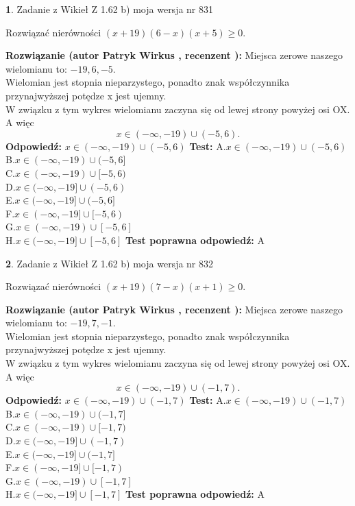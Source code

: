 \documentclass[12pt, a4paper]{article}
\theoremstyle{definition} %
\newtheorem{zad}{}
\newcommand{\zadStart}[1]{\begin{zad}#1\newline}
\newcommand{\zadStop}{\end{zad}}
\newcommand{\rozwStart}[2]{\noindent \textbf{Rozwiązanie (autor #1 , recenzent #2): }\newline}
\newcommand{\rozwStop}{\newline}
\newcommand{\odpStart}{\noindent \textbf{Odpowiedź:}\newline}
\newcommand{\odpStop}{\newline}
\newcommand{\testStart}{\noindent \textbf{Test:}\newline}
\newcommand{\testStop}{\newline}
\newcommand{\kluczStart}{\noindent \textbf{Test poprawna odpowiedź:}\newline}
\newcommand{\kluczStop}{\newline}
\begin{document}
\zadStart{Zadanie z Wikieł Z 1.62 b) moja wersja nr 831}

Rozwiązać nierówności $(x+19)(6-x)(x+5)\ge0$.
\zadStop
\rozwStart{Patryk Wirkus}{}
Miejsca zerowe naszego wielomianu to: $-19, 6, -5$.\\
Wielomian jest stopnia nieparzystego, ponadto znak współczynnika przy\linebreak najwyższej potędze x jest ujemny.\\ W związku z tym wykres wielomianu zaczyna się od lewej strony powyżej osi OX. A więc $$x \in (-\infty,-19) \cup (-5,6).$$
\rozwStop
\odpStart
$x \in (-\infty,-19) \cup (-5,6)$
\odpStop
\testStart
A.$x \in (-\infty,-19) \cup (-5,6)$\\
B.$x \in (-\infty,-19) \cup (-5,6]$\\
C.$x \in (-\infty,-19) \cup [-5,6)$\\
D.$x \in (-\infty,-19] \cup (-5,6)$\\
E.$x \in (-\infty,-19] \cup (-5,6]$\\
F.$x \in (-\infty,-19] \cup [-5,6)$\\
G.$x \in (-\infty,-19) \cup [-5,6]$\\
H.$x \in (-\infty,-19] \cup [-5,6]$
\testStop
\kluczStart
A
\kluczStop



\zadStart{Zadanie z Wikieł Z 1.62 b) moja wersja nr 832}

Rozwiązać nierówności $(x+19)(7-x)(x+1)\ge0$.
\zadStop
\rozwStart{Patryk Wirkus}{}
Miejsca zerowe naszego wielomianu to: $-19, 7, -1$.\\
Wielomian jest stopnia nieparzystego, ponadto znak współczynnika przy\linebreak najwyższej potędze x jest ujemny.\\ W związku z tym wykres wielomianu zaczyna się od lewej strony powyżej osi OX. A więc $$x \in (-\infty,-19) \cup (-1,7).$$
\rozwStop
\odpStart
$x \in (-\infty,-19) \cup (-1,7)$
\odpStop
\testStart
A.$x \in (-\infty,-19) \cup (-1,7)$\\
B.$x \in (-\infty,-19) \cup (-1,7]$\\
C.$x \in (-\infty,-19) \cup [-1,7)$\\
D.$x \in (-\infty,-19] \cup (-1,7)$\\
E.$x \in (-\infty,-19] \cup (-1,7]$\\
F.$x \in (-\infty,-19] \cup [-1,7)$\\
G.$x \in (-\infty,-19) \cup [-1,7]$\\
H.$x \in (-\infty,-19] \cup [-1,7]$
\testStop
\kluczStart
A
\kluczStop
\end{document}

